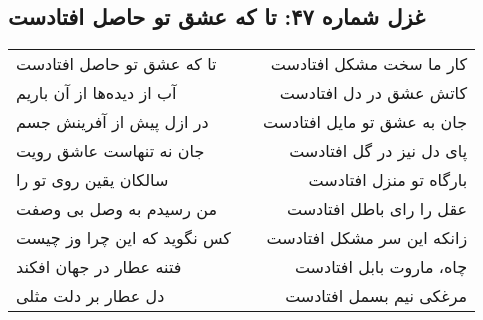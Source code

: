 \begin{center}
\section*{غزل شماره ۴۷: تا که عشق تو حاصل افتادست}
\label{sec:047}
\begin{longtable}{l p{0.5cm} r}
تا که عشق تو حاصل افتادست
&&
کار ما سخت مشکل افتادست
\\
آب از دیده‌ها از آن باریم
&&
کاتش عشق در دل افتادست
\\
در ازل پیش از آفرینش جسم
&&
جان به عشق تو مایل افتادست
\\
جان نه تنهاست عاشق رویت
&&
پای دل نیز در گل افتادست
\\
سالکان یقین روی تو را
&&
بارگاه تو منزل افتادست
\\
من رسیدم به وصل بی وصفت
&&
عقل را رای باطل افتادست
\\
کس نگوید که این چرا وز چیست
&&
زانکه این سر مشکل افتادست
\\
فتنه عطار در جهان افکند
&&
چاه، ماروت بابل افتادست
\\
دل عطار بر دلت مثلی
&&
مرغکی نیم بسمل افتادست
\\
\end{longtable}
\end{center}
